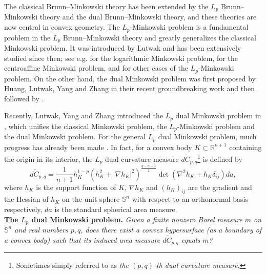 \documentclass[11pt]{amsart}
\newcommand{\uS}{\mathbb{S}^{n}}
\numberwithin{equation} {section}
\numberwithin{equation}{section}
\begin{document}
The classical Brunn--Minkowski theory has been extended by the $L_p$ Brunn--Minkowski theory and the dual Brunn--Minkowski theory, and these theories are now central in convex geometry. The $L_p$-Minkowski problem is a fundamental problem in the $L_p$ Brunn--Minkowski theory and greatly generalizes the classical Minkowski problem. It was introduced by Lutwak \cite{Lut.JDG.38-1993.131, Lut.Adv.118-1996.244} and has been extensively studied since then; see e.g.
\cite{%
  BLYZ.JAMS.26-2013.831,
  CLZ.TAMS.371-2019.2623,
  Zhu.Adv.262-2014.909}
for the logarithmic Minkowski problem,
\cite{JLW.JFA.274-2018.826,
  JLZ.CVPDE.55-2016.41,
  Lu.SCM.61-2018.511,
  Lu.JDE.266-2019.4394,
  LW.JDE.254-2013.983,
  Zhu.JDG.101-2015.159}
for the centroaffine Minkowski problem, and
\cite{CW.Adv.205-2006.33,
  HLYZ.DCG.33-2005.699,
  LYZ.TAMS.356-2004.4359,
  Sta.Adv.167-2002.160}
for other cases of the $L_p$-Minkowski problem. On the other hand, the dual Minkowski problem was first proposed by Huang, Lutwak, Yang and Zhang
in their recent groundbreaking work \cite{HLYZ.Acta.216-2016.325} and then
followed by
\cite{BHP.JDG.109-2018.411,
  HP.Adv.323-2018.114,
  HJ.JFA.277-2019.2209,
  LSW.JEMSJ.22-2020.893,
  Zha.CVPDE.56-2017.18,
  Zha.JDG.110-2018.543}.

  Recently, Lutwak, Yang and Zhang introduced the $L_p$ dual Minkowski problem in \cite{LYZ18}, which unifies the classical Minkowski problem, the $L_p$-Minkowski problem and the dual Minkowski problem. For the general $L_p$ dual Minkowski problem, much progress has already been made
\cite{BF.JDE.266-2019.7980,
  CHZ.MA.373-2019.953,
  CCL,
  HLYZ.JDG.110-2018.1,
  HZ.Adv.332-2018.57,
  LLL}. 
  In fact, for a convex body $K\subset \mathbb{R}^{n+1}$ containing the origin in its interior, the $L_p$ dual curvature measure $d\widetilde{C}_{p,q}$\footnote{Sometimes simply referred to as \emph{the $(p,q)$-th dual curvature measure}.} is defined by
  \begin{equation*}
      d\widetilde{C}_{p,q} =\frac{1}{n+1}h_K^{1-p}\left(h_K^2 + |\nabla h_K|^2\right)^{\frac{q-n-1}{2}}\det(\nabla^2 h_K+h_K\delta_{ij})da,
  \end{equation*}
where $h_K$ is the support function of $K$, $\nabla h_K$ and $(h_K)_{ij}$ are the gradient and the Hessian of $h_K$ on the unit sphere $\uS$ with respect to an orthonormal basis respectively, 
$da$ is the standard spherical area measure.\\
{\bf The $L_p$ dual Minkowski problem.} \emph{Given a finite nonzero Borel measure $m$ on $\uS$ and real numbers $p,q$, does there exist a convex hypersurface (as a boundary of a convex body) such that its induced area measure $d\tilde{C}_{p,q}$ equals $m$?}
\end{document}
